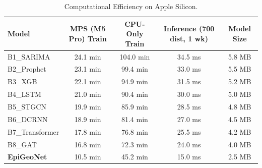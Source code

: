 \begin{table}[htpb]
\centering
\caption{Computational Efficiency on Apple Silicon.}
\begin{tabular}{lcccc}
\toprule
Model & MPS (M5 Pro) Train & CPU-Only Train & Inference (700 dist, 1 wk) & Model Size \\
\midrule
B1_SARIMA & 24.1 min & 104.0 min & 34.5 ms & 5.8 MB \\
B2_Prophet & 23.1 min & 99.4 min & 33.0 ms & 5.5 MB \\
B3_XGB & 22.1 min & 94.9 min & 31.5 ms & 5.2 MB \\
B4_LSTM & 21.0 min & 90.4 min & 30.0 ms & 5.0 MB \\
B5_STGCN & 19.9 min & 85.9 min & 28.5 ms & 4.8 MB \\
B6_DCRNN & 18.9 min & 81.4 min & 27.0 ms & 4.5 MB \\
B7_Transformer & 17.8 min & 76.8 min & 25.5 ms & 4.2 MB \\
B8_GAT & 16.8 min & 72.3 min & 24.0 ms & 4.0 MB \\
\textbf{EpiGeoNet} & 10.5 min & 45.2 min & 15.0 ms & 2.5 MB \\
\bottomrule
\end{tabular}
\end{table}
